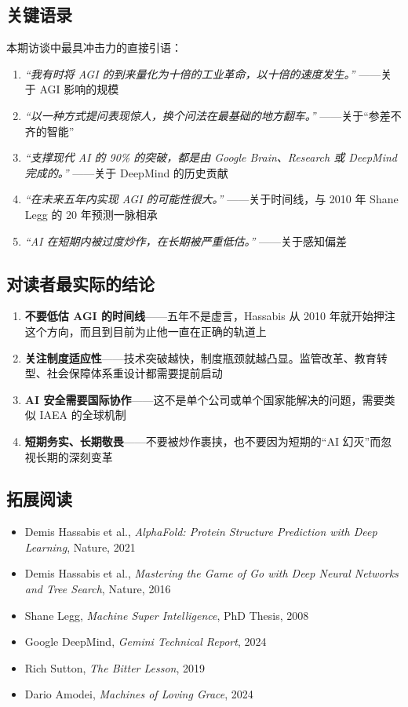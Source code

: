 \documentclass[a4paper]{article}
\begin{document}
\subsection{关键语录}

本期访谈中最具冲击力的直接引语：

\begin{enumerate}
    \item \textit{``我有时将 AGI 的到来量化为十倍的工业革命，以十倍的速度发生。''} ——关于 AGI 影响的规模
    \item \textit{``以一种方式提问表现惊人，换个问法在最基础的地方翻车。''} ——关于``参差不齐的智能''
    \item \textit{``支撑现代 AI 的 90\% 的突破，都是由 Google Brain、Research 或 DeepMind 完成的。''} ——关于 DeepMind 的历史贡献
    \item \textit{``在未来五年内实现 AGI 的可能性很大。''} ——关于时间线，与 2010 年 Shane Legg 的 20 年预测一脉相承
    \item \textit{``AI 在短期内被过度炒作，在长期被严重低估。''} ——关于感知偏差
\end{enumerate}

\subsection{对读者最实际的结论}

\begin{enumerate}
    \item \textbf{不要低估 AGI 的时间线}——五年不是虚言，Hassabis 从 2010 年就开始押注这个方向，而且到目前为止他一直在正确的轨道上
    \item \textbf{关注制度适应性}——技术突破越快，制度瓶颈就越凸显。监管改革、教育转型、社会保障体系重设计都需要提前启动
    \item \textbf{AI 安全需要国际协作}——这不是单个公司或单个国家能解决的问题，需要类似 IAEA 的全球机制
    \item \textbf{短期务实、长期敬畏}——不要被炒作裹挟，也不要因为短期的``AI 幻灭''而忽视长期的深刻变革
\end{enumerate}

\subsection{拓展阅读}

\begin{itemize}
    \item Demis Hassabis et al., \textit{AlphaFold: Protein Structure Prediction with Deep Learning}, Nature, 2021
    \item Demis Hassabis et al., \textit{Mastering the Game of Go with Deep Neural Networks and Tree Search}, Nature, 2016
    \item Shane Legg, \textit{Machine Super Intelligence}, PhD Thesis, 2008
    \item Google DeepMind, \textit{Gemini Technical Report}, 2024
    \item Rich Sutton, \textit{The Bitter Lesson}, 2019
    \item Dario Amodei, \textit{Machines of Loving Grace}, 2024
\end{itemize}
\end{document}
